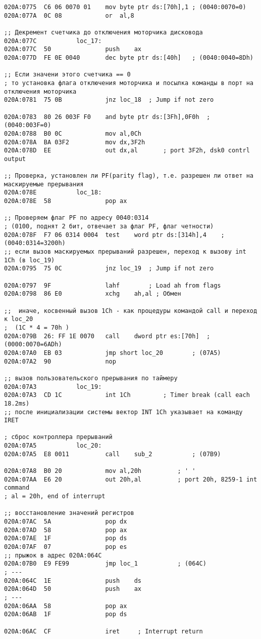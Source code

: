\begin{lstlisting}[style={asm}]
020A:0775  C6 06 0070 01	mov	byte ptr ds:[70h],1	; (0040:0070=0)
020A:077A  0C 08			or	al,8

;; Декремент счетчика до отключения моторчика дисковода
020A:077C			loc_17:
020A:077C  50				push	ax
020A:077D  FE 0E 0040		dec	byte ptr ds:[40h]	; (0040:0040=8Dh)

;; Если значени этого счетчика == 0
; то установка флага отключения моторчика и посылка команды в порт на отключения моторчика
020A:0781  75 0B			jnz	loc_18	; Jump if not zero

020A:0783  80 26 003F F0	and	byte ptr ds:[3Fh],0F0h	; (0040:003F=0)
020A:0788  B0 0C			mov	al,0Ch 
020A:078A  BA 03F2			mov	dx,3F2h 
020A:078D  EE				out	dx,al		; port 3F2h, dsk0 contrl output

;; Проверка, установлен ли PF(parity flag), т.е. разрешен ли ответ на маскируемые прерывания
020A:078E			loc_18:
020A:078E  58				pop	ax

;; Проверяем флаг PF по адресу 0040:0314
; (0100, поднят 2 бит, отвечает за флаг PF, флаг четности)
020A:078F  F7 06 0314 0004	test	word ptr ds:[314h],4	; (0040:0314=3200h)
;; если вызов маскируемых прерываний разрешен, переход к вызову int 1Ch (в loc_19)
020A:0795  75 0C			jnz	loc_19	; Jump if not zero

020A:0797  9F				lahf		; Load ah from flags
020A:0798  86 E0			xchg	ah,al ; Обмен

;;  иначе, косвенный вызов 1Сh - как процедуры командой call и переход к loc_20
;  (1C * 4 = 70h )
020A:079B  26: FF 1E 0070	call	dword ptr es:[70h]	; (0000:0070=6ADh)
020A:07A0  EB 03			jmp	short loc_20		; (07A5)
020A:07A2  90				nop

;; вызов пользовательского прерывания по таймеру
020A:07A3			loc_19:
020A:07A3  CD 1C			int	1Ch			; Timer break (call each 18.2ms)
;; после инициализации системы вектор INT 1Ch указывает на команду IRET

; сброс контроллера прерываний
020A:07A5			loc_20:
020A:07A5  E8 0011			call	sub_2			; (07B9)

020A:07A8  B0 20			mov	al,20h			; ' '
020A:07AA  E6 20			out	20h,al			; port 20h, 8259-1 int command
; al = 20h, end of interrupt 

;; восстановление значений регистров
020A:07AC  5A				pop	dx
020A:07AD  58				pop	ax
020A:07AE  1F				pop	ds
020A:07AF  07				pop	es
;; прыжок в адрес 020A:064C
020A:07B0  E9 FE99			jmp	loc_1			; (064C)
; ---
020A:064C  1E				push	ds
020A:064D  50				push	ax
; ---
020A:06AA  58				pop	ax
020A:06AB  1F				pop	ds

020A:06AC  CF				iret	 ; Interrupt return
\end{lstlisting}

